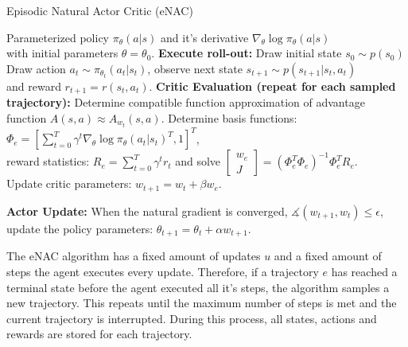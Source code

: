 \begin{algorithm}
	\caption{Episodic Natural Actor Critic (eNAC)}\label{enac-algo}
	\begin{algorithmic}[1]
		\REQUIRE Parameterized policy $\pi_{\theta}(a|s)$ and it's derivative $\nabla_\theta\log\pi_{\theta}(a|s)$\\
		\hspace{1.05cm}  with initial parameters $\theta=\theta_0$.
		\STATE \textbf{Execute roll-out:} Draw initial state $s_0 \sim p(s_0)$
		\STATE Draw action $a_t\sim\pi_{\theta_t}(a_t|s_t)$, observe next state $s_{t+1} \sim p(s_{t+1}|s_t, a_t)$\\
		and reward $r_{t+1} = r(s_t, a_t)$.
		\ENDFOR
		\ENDFOR
		\STATE \textbf{Critic Evaluation (repeat for each sampled trajectory):} Determine compatible function approximation of advantage function $A(s,a) \approx A_{w_t}(s, a)$.
		\STATE Determine basis functions: $\Phi_e = \left[\sum_{t=0}^T\gamma^t\nabla_\theta\log\pi_{\theta}(a_t|s_t)^T, 1\right]^T$, \\
		reward statistics: $R_e=\sum_{t=0}^T\gamma^t r_t$ and solve $\begin{bmatrix} w_{e}\\J \end{bmatrix} = (\Phi_e^T \Phi_e)^{-1} \Phi_e^T R_e$.\\
		Update critic parameters: $w_{t+1} = w_t + \beta w_{e}$.
		
		\STATE \textbf{Actor Update:} When the natural gradient is converged, $\measuredangle (w_{t+1}, w_t)\leq\epsilon$, update the policy parameters: $\theta_{t+1} = \theta_t + \alpha w_{t+1}$.
		\ENDFOR
	\end{algorithmic}
\end{algorithm}

\noindent The eNAC algorithm has a fixed amount of updates $u$ and a fixed amount of steps the agent executes every update. Therefore, if a trajectory $e$ has reached a terminal state before the agent executed all it's steps, the algorithm samples a new trajectory. This repeats until the maximum number of steps is met and the current trajectory is interrupted. During this process, all states, actions and rewards are stored for each trajectory.

